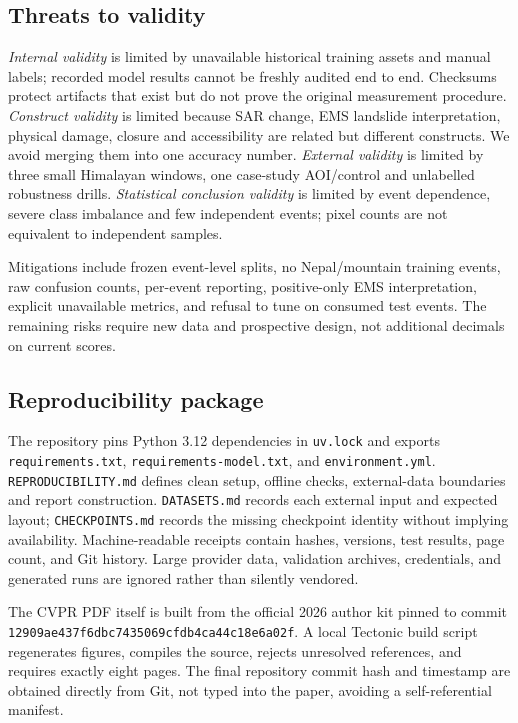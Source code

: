 \documentclass[10pt,twocolumn,letterpaper]{article}
\begin{document}
\subsection{Threats to validity}
\emph{Internal validity} is limited by unavailable historical training assets and
manual labels; recorded model results cannot be freshly audited end to end.
Checksums protect artifacts that exist but do not prove the original measurement
procedure. \emph{Construct validity} is limited because SAR change, EMS landslide
interpretation, physical damage, closure and accessibility are related but
different constructs. We avoid merging them into one accuracy number.
\emph{External validity} is limited by three small Himalayan windows, one
case-study AOI/control and unlabelled robustness drills. \emph{Statistical
conclusion validity} is limited by event dependence, severe class imbalance and
few independent events; pixel counts are not equivalent to independent samples.

Mitigations include frozen event-level splits, no Nepal/mountain training events,
raw confusion counts, per-event reporting, positive-only EMS interpretation,
explicit unavailable metrics, and refusal to tune on consumed test events. The
remaining risks require new data and prospective design, not additional decimals
on current scores.

\subsection{Reproducibility package}
The repository pins Python 3.12 dependencies in \texttt{uv.lock} and exports
\texttt{requirements.txt}, \texttt{requirements-model.txt}, and
\texttt{environment.yml}. \texttt{REPRODUCIBILITY.md} defines clean setup,
offline checks, external-data boundaries and report construction.
\texttt{DATASETS.md} records each external input and expected layout;
\texttt{CHECKPOINTS.md} records the missing checkpoint identity without implying
availability. Machine-readable receipts contain hashes, versions, test results,
page count, and Git history. Large provider data, validation archives,
credentials, and generated runs are ignored rather than silently vendored.

The CVPR PDF itself is built from the official 2026 author kit pinned to commit
\texttt{12909ae437f6dbc7435069cfdb4ca44c18e6a02f}. A local Tectonic build script
regenerates figures, compiles the source, rejects unresolved references, and
requires exactly eight pages. The final repository commit hash and timestamp are
obtained directly from Git, not typed into the paper, avoiding a self-referential
manifest.
\end{document}
